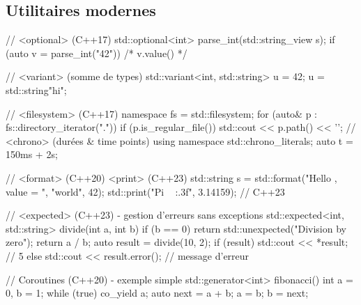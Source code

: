 \documentclass{article}
\begin{document}
\begin{multicols*}{4}

\section*{Utilitaires modernes}

\begin{cppcode}
// <optional> (C++17)
std::optional<int> parse_int(std::string_view s);
if (auto v = parse_int("42")) { /* v.value() */ }

// <variant> (somme de types)
std::variant<int, std::string> u = 42;
u = std::string{"hi"};

// <filesystem> (C++17)
namespace fs = std::filesystem;
for (auto& p : fs::directory_iterator(".")) {
    if (p.is_regular_file()) std::cout << p.path() << '\n';
}
// <chrono> (durées & time points)
using namespace std::chrono_literals;
auto t = 150ms + 2s;

// <format> (C++20) <print> (C++23)
std::string s = std::format("Hello {}, value = {}", "world", 42);
std::print("Pi ~ {:.3f}\n", 3.14159); // C++23

// <expected> (C++23) - gestion d'erreurs sans exceptions
std::expected<int, std::string> divide(int a, int b) {
    if (b == 0) return std::unexpected("Division by zero");
    return a / b;
}
auto result = divide(10, 2);
if (result) std::cout << *result; // 5
else std::cout << result.error(); // message d'erreur

// Coroutines (C++20) - exemple simple
std::generator<int> fibonacci() {
    int a = 0, b = 1;
    while (true) {
        co_yield a; auto next = a + b;
        a = b; b = next; } }
\end{cppcode}





\end{multicols*}
\end{document}
